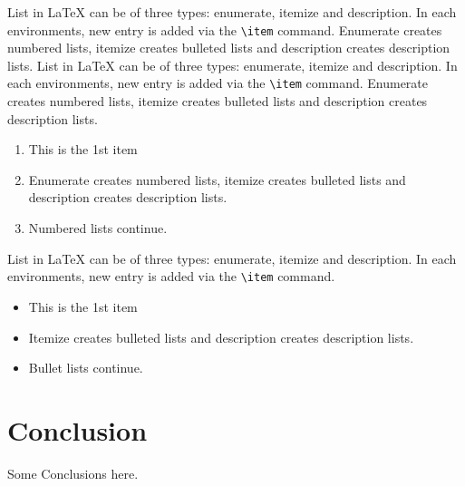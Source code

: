 \documentclass{CUP-JNL-DAP}%
\begin{document}
List in \LaTeX{} can be of three types: enumerate, itemize and description.
In each environments, new entry is added via the \verb+\item+ command.
Enumerate creates numbered lists, itemize creates bulleted lists and
description creates description lists.
List in \LaTeX{} can be of three types: enumerate, itemize and description.
In each environments, new entry is added via the \verb+\item+ command.
Enumerate creates numbered lists, itemize creates bulleted lists and
description creates description lists.
\begin{enumerate}[1.]
\item This is the 1st item
\item Enumerate creates numbered lists, itemize creates bulleted lists and
description creates description lists.
\item Numbered lists continue.
\end{enumerate}
List in \LaTeX{} can be of three types: enumerate, itemize and description.
In each environments, new entry is added via the \verb+\item+ command.
\begin{itemize}
\item This is the 1st item
\item Itemize creates bulleted lists and
description creates description lists.
\item Bullet lists continue.
\end{itemize}



\section{Conclusion}

Some Conclusions here.
\end{document}
